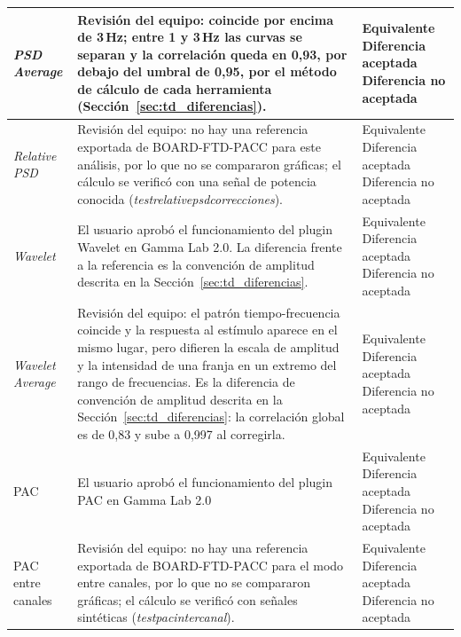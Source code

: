 \documentclass[12pt,letterpaper,oneside]{article}
\DeclareRobustCommand{\_}{\textunderscore\allowbreak}
\newcommand{\casilla}[1]{%
    \fbox{\makebox[1em][c]{#1}}%
}
\begin{document}
\begin{center}
\begin{longtable}{|>{\raggedright\arraybackslash}p{}|>{\raggedright\arraybackslash}p{}|>{\raggedright\arraybackslash}p{}|}
\hline
\textit{PSD Average} & Revisión del equipo: coincide por encima de 3\,Hz; entre 1 y 3\,Hz las curvas se separan y la correlación queda en 0,93, por debajo del umbral de 0,95, por el método de cálculo de cada herramienta (Sección~\ref{sec:td_diferencias}). & \casilla{} Equivalente \newline \casilla{} Diferencia aceptada \newline \casilla{x} Diferencia no aceptada \\
\hline
\textit{Relative PSD} & Revisión del equipo: no hay una referencia exportada de BOARD-FTD-PACC para este análisis, por lo que no se compararon gráficas; el cálculo se verificó con una señal de potencia conocida (\textit{test\_relative\_psd\_correcciones}). & \casilla{} Equivalente \newline \casilla{} Diferencia aceptada \newline \casilla{} Diferencia no aceptada \\
\hline
\textit{Wavelet} & El usuario aprobó el funcionamiento del plugin Wavelet en Gamma Lab 2.0. La diferencia frente a la referencia es la convención de amplitud descrita en la Sección~\ref{sec:td_diferencias}. & \casilla{} Equivalente \newline \casilla{x} Diferencia aceptada \newline \casilla{} Diferencia no aceptada \\
\hline
\textit{Wavelet Average} & Revisión del equipo: el patrón tiempo-frecuencia coincide y la respuesta al estímulo aparece en el mismo lugar, pero difieren la escala de amplitud y la intensidad de una franja en un extremo del rango de frecuencias. Es la diferencia de convención de amplitud descrita en la Sección~\ref{sec:td_diferencias}: la correlación global es de 0,83 y sube a 0,997 al corregirla. & \casilla{} Equivalente \newline \casilla{x} Diferencia aceptada \newline \casilla{} Diferencia no aceptada \\
\hline
PAC & El usuario aprobó el funcionamiento del plugin PAC en Gamma Lab 2.0 & \casilla{x} Equivalente \newline \casilla{} Diferencia aceptada \newline \casilla{} Diferencia no aceptada \\
\hline
PAC entre canales & Revisión del equipo: no hay una referencia exportada de BOARD-FTD-PACC para el modo entre canales, por lo que no se compararon gráficas; el cálculo se verificó con señales sintéticas (\textit{test\_pac\_intercanal}). & \casilla{} Equivalente \newline \casilla{} Diferencia aceptada \newline \casilla{} Diferencia no aceptada \\

\end{longtable}
\end{center}
\end{document}
